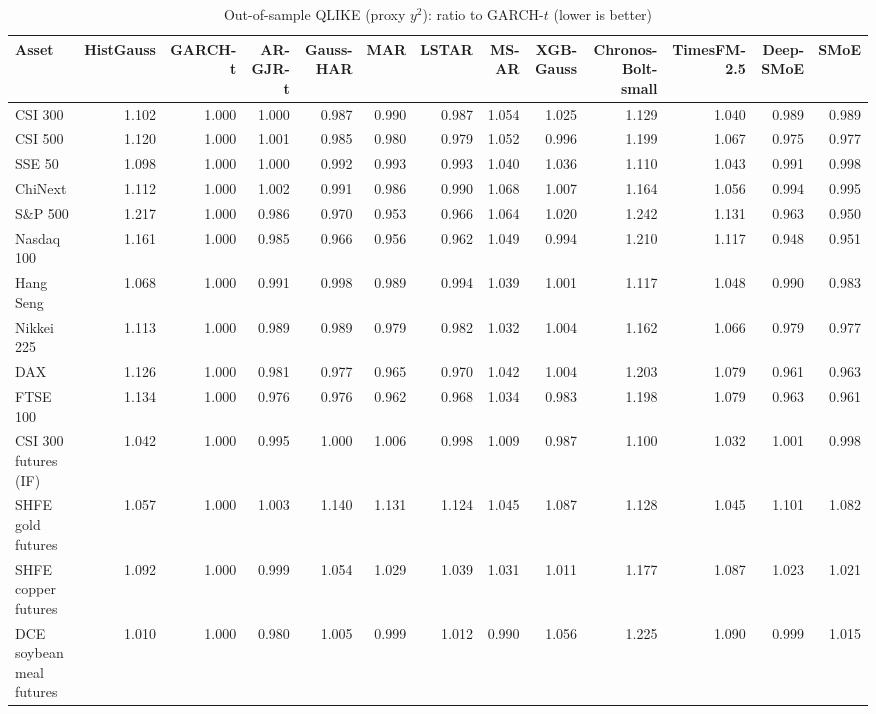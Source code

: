 \begin{table}[!htbp]\centering\scriptsize
\caption{Out-of-sample QLIKE (proxy $y^2$): ratio to GARCH-$t$ (lower is better)}\label{tab:loss_QLIKE}
\begin{adjustbox}{max width=\textwidth}
\begin{tabular}{lrrrrrrrrrrrr}
\toprule
Asset & HistGauss & GARCH-t & AR-GJR-t & Gauss-HAR & MAR & LSTAR & MS-AR & XGB-Gauss & Chronos-Bolt-small & TimesFM-2.5 & Deep-SMoE & SMoE\\
\midrule
CSI 300 & 1.102 & 1.000 & 1.000 & 0.987 & 0.990 & 0.987 & 1.054 & 1.025 & 1.129 & 1.040 & 0.989 & 0.989\\
CSI 500 & 1.120 & 1.000 & 1.001 & 0.985 & 0.980 & 0.979 & 1.052 & 0.996 & 1.199 & 1.067 & 0.975 & 0.977\\
SSE 50 & 1.098 & 1.000 & 1.000 & 0.992 & 0.993 & 0.993 & 1.040 & 1.036 & 1.110 & 1.043 & 0.991 & 0.998\\
ChiNext & 1.112 & 1.000 & 1.002 & 0.991 & 0.986 & 0.990 & 1.068 & 1.007 & 1.164 & 1.056 & 0.994 & 0.995\\
S\&P 500 & 1.217 & 1.000 & 0.986 & 0.970 & 0.953 & 0.966 & 1.064 & 1.020 & 1.242 & 1.131 & 0.963 & 0.950\\
Nasdaq 100 & 1.161 & 1.000 & 0.985 & 0.966 & 0.956 & 0.962 & 1.049 & 0.994 & 1.210 & 1.117 & 0.948 & 0.951\\
Hang Seng & 1.068 & 1.000 & 0.991 & 0.998 & 0.989 & 0.994 & 1.039 & 1.001 & 1.117 & 1.048 & 0.990 & 0.983\\
Nikkei 225 & 1.113 & 1.000 & 0.989 & 0.989 & 0.979 & 0.982 & 1.032 & 1.004 & 1.162 & 1.066 & 0.979 & 0.977\\
DAX & 1.126 & 1.000 & 0.981 & 0.977 & 0.965 & 0.970 & 1.042 & 1.004 & 1.203 & 1.079 & 0.961 & 0.963\\
FTSE 100 & 1.134 & 1.000 & 0.976 & 0.976 & 0.962 & 0.968 & 1.034 & 0.983 & 1.198 & 1.079 & 0.963 & 0.961\\
CSI 300 futures (IF) & 1.042 & 1.000 & 0.995 & 1.000 & 1.006 & 0.998 & 1.009 & 0.987 & 1.100 & 1.032 & 1.001 & 0.998\\
SHFE gold futures & 1.057 & 1.000 & 1.003 & 1.140 & 1.131 & 1.124 & 1.045 & 1.087 & 1.128 & 1.045 & 1.101 & 1.082\\
SHFE copper futures & 1.092 & 1.000 & 0.999 & 1.054 & 1.029 & 1.039 & 1.031 & 1.011 & 1.177 & 1.087 & 1.023 & 1.021\\
DCE soybean meal futures & 1.010 & 1.000 & 0.980 & 1.005 & 0.999 & 1.012 & 0.990 & 1.056 & 1.225 & 1.090 & 0.999 & 1.015\\

\end{tabular}
\end{adjustbox}
\end{table}
